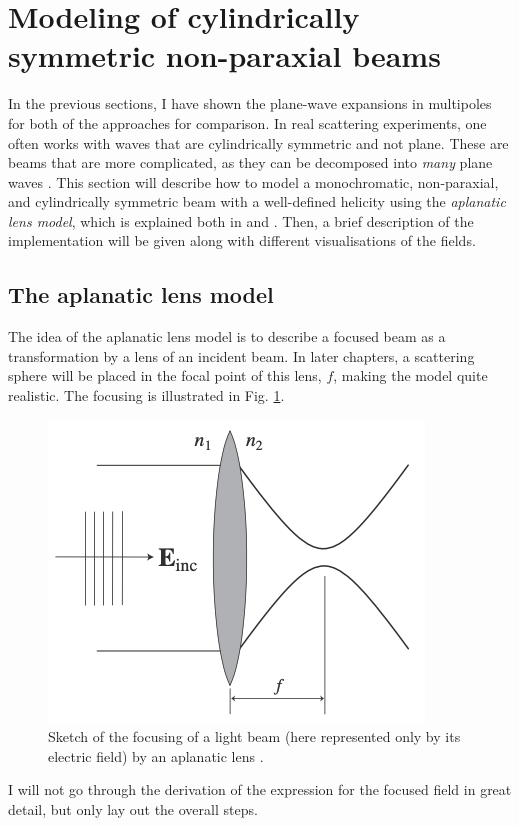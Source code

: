 \section{Modeling of cylindrically symmetric non-paraxial beams}

In the previous sections, I have shown the plane-wave expansions in multipoles for both of the approaches for comparison. In real scattering experiments, one often works with waves that are cylindrically symmetric and not plane. These are beams that are more complicated, as they can be decomposed into \textit{many} plane waves \cite{xavi}. 
This section will describe how to model a monochromatic, non-paraxial, and cylindrically symmetric beam with a well-defined helicity using the \textit{aplanatic lens model}, which is explained both in \cite{nanooptics} and \cite{xavi}. Then, a brief description of the implementation will be given along with different visualisations of the fields.

\subsection{The aplanatic lens model}
The idea of the aplanatic lens model is to describe a focused beam as a transformation by a lens of an incident beam. In later chapters, a scattering sphere will be placed in the focal point of this lens, \( f \), making the model quite realistic. The focusing is illustrated in Fig. \ref{fig:aplanatic}.

\begin{figure}
    \includegraphics[width=0.5\linewidth]{Figures/aplanatic_lens.png}
    \caption{Sketch of the focusing of a light beam (here represented only by its electric field) by an aplanatic lens \cite{nanooptics}.}
    \label{fig:aplanatic}
\end{figure}

I will not go through the derivation of the expression for the focused field in great detail, but only lay out the overall steps.

